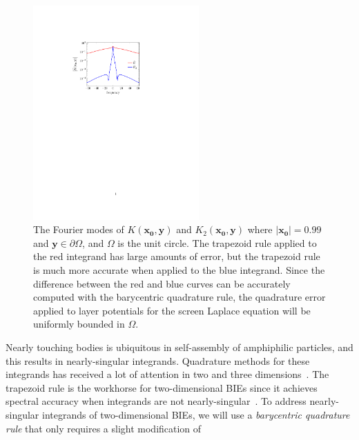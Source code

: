 \begin{figure}
\centerline{\includegraphics[width=2.5in]{figures/integrands}}
\vspace*{-13pt}
  \caption{{\footnotesize The Fourier modes of
  $K(\mathbf{x_0},\mathbf{y})$ and $K_2(\mathbf{x_0},\mathbf{y})$ where
  $|\mathbf{x_0}| = 0.99$ and $\mathbf{y} \in \partial\Omega$, and
  $\Omega$ is the unit circle. The trapezoid rule applied to the red
  integrand has large amounts of error, but the trapezoid rule is much
  more accurate when applied to the blue integrand. Since the difference
  between the red and blue curves can be accurately computed with the
  barycentric quadrature rule, the quadrature error applied to layer
  potentials for the screen Laplace equation will be uniformly bounded
  in $\Omega$.}}
\label{fig:integrands}
\end{figure}
Nearly touching bodies is ubiquitous in self-assembly of amphiphilic
particles, and this results in nearly-singular integrands. Quadrature
methods for these integrands has received a lot of attention in two and
three dimensions~\cite{alpert, kapur, sidi, duffy, bruno1, bruno2,
davis_1984, graglia_2008, hackbusch_sauter_1994, jarvenpaa_2003,
khayat_2005, schwab_1992, ying_2006, beale1, beale2, goodman_1990,
haroldson_1998, lowengrub_1993, schwab_1992, ggq1, ggq2, ggq3,
helsing_2008a, helsing_integral_2009, helsing_tutorial_2012,
klockner2013jcp, qbx2, wala2019jcp, af2018sisc, siegel2018jcp,
rachh2017jcp, ding2019arxiv, bar2014}. The trapezoid rule is the
workhorse for two-dimensional BIEs since it achieves spectral accuracy
when integrands are not nearly-singular~\cite{tre-wei2014}. To address
nearly-singular integrands of two-dimensional BIEs, we will use a {\em
barycentric quadrature rule} that only requires a slight modification of
